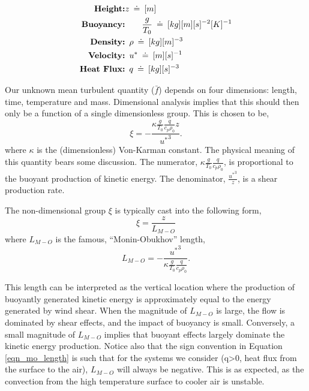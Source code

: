 \begin{eqnarray}
 \textbf{Height:}& z\enskip \dot = \enskip [m]  \\
 \textbf{Buoyancy:}& \qquad \frac{g}{T_0}\enskip \dot = \enskip [kg] [m] [s]^{-2}
  [K]^{-1} \\ 
 \textbf{Density:}&  \enskip \rho \enskip \dot = \enskip [kg] [m]^{-3}  \\
 \textbf{Velocity:}& \enskip u^* \enskip \dot = \enskip [m] [s]^{-1} \\
 \textbf{Heat Flux:}& \enskip q \enskip \dot = \enskip [kg] [s]^{-3} 
\end{eqnarray}

Our unknown mean turbulent quantity ($\bar f$) depends on four
dimensions: length, time, temperature and mass. Dimensional analysis
implies that this should then only be a function of a single dimensionless
group\cite{munson2012fundamentals}. This is chosen to be,
\begin{equation}
 \xi = -\frac{\kappa \frac{g}{T_0} \frac{q}{c_p \rho_0} z}{ {u^*}^3}.
\end{equation}
where $\kappa$ is the (dimensionless) Von-Karman constant. 
The physical meaning of this quantity bears some discussion.  
The numerator, $\kappa \frac{g}{T_0} \frac{q}{c_p \rho_0} $, is
proportional to the buoyant production of kinetic energy.  The
denominator, $\frac{{u^*}^3}{z}$, is a shear production rate. 

The non-dimensional group $\xi$ is typically cast into the following 
form, 
\begin{equation}
 \xi = \frac{z}{L_{M-O}}
\end{equation}
where $L_{M-O}$ is the famous, ``Monin-Obukhov'' length,
\begin{equation}
 L_{M-O} = -\frac{{u^*}^3}{\kappa \frac{g}{T_0} \frac{q}{c_p \rho_0}}. 
  \label{eqn_mo_length}
\end{equation}

This length can be interpreted as the vertical location
where the production of buoyantly generated kinetic energy is
approximately equal to the energy generated by wind shear. When the
magnitude of $L_{M-O}$ is large, the flow is dominated by shear effects,
and the impact of buoyancy is small. Conversely, a small magnitude of
$L_{M-O}$ implies that buoyant effects largely dominate the kinetic
energy production. Notice also that the sign convention in Equation
\ref{eqn_mo_length} is such that for the systems we consider (q>0, heat
flux from the surface to the air), $L_{M-O}$ will always be
negative. This is as expected, as the convection from the high
temperature surface to cooler air is unstable. 


